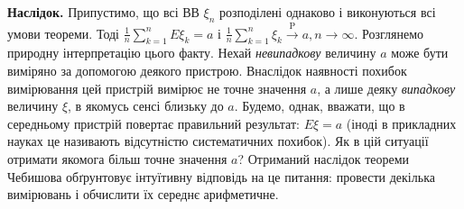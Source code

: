 \noindent\textbf{Наслідок.}
    Припустимо, що всі ВВ $\xi_n$ розподілені однаково і виконуються всі умови теореми. Тоді 
    $\frac{1}{n}\sum\limits_{k=1}^n E\xi_k = a$ і $\frac{1}{n}\sum\limits_{k=1}^n \xi_k 
    \overset{\mathrm{P}}{\longrightarrow} a, n\to\infty$. Розглянемо природну інтерпретацію цього факту.
    Нехай \emph{невипадкову} величину $a$ може бути виміряно за допомогою деякого пристрою. 
    Внаслідок наявності похибок вимірювання цей пристрій вимірює не точне значення $a$, 
    а лише деяку \emph{випадкову} величину $\xi$, в якомусь сенсі близьку до $a$. 
    Будемо, однак, вважати, що в середньому пристрій повертає правильний результат: 
    $E\xi=a$ (іноді в прикладних науках це називають відсутністю систематичних похибок). 
    Як в цій ситуації отримати якомога більш точне значення $a$? Отриманий наслідок теореми Чебишова обґрунтовує
    інтуїтивну відповідь на це питання: провести декілька вимірювань і обчислити їх середнє арифметичне.

